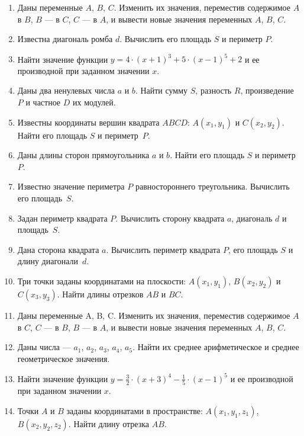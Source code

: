 \begin{enumerate}
\item Даны переменные $A$, $B$, $C$. Изменить их значения,
переместив содержимое $A$ в $B$, $B$ --- в $C$,
$C$ --- в $A$, и вывести новые значения переменных $A$,
$B$, $C$.

\item Известна диагональ ромба $d$. Вычислить его площадь $S$ и периметр
$P$.

\item Найти значение функции  $y=4\cdot (x+1)^{3}+5\cdot (x-1)^{5}+2$ и ее производной при заданном значении
$x$.

\item Даны два ненулевых числа $a$ и $b$. Найти сумму $S$,
разность $R$, произведение $P$ и частное $D$ их модулей.

\item Известны координаты вершин квадрата $ABCD$:
$A(x_1,y_1)$ и $C(x_2,y_2)$. Найти его площадь $S$ и периметр~$P$.

\item Даны длины сторон прямоугольника $a$ и $b$. Найти его площадь
$S$ и периметр~$P$.

\item Известно значение периметра $P$ равностороннего треугольника. Вычислить его площадь~$S$.

\item Задан периметр квадрата $P$. Вычислить сторону квадрата $a$, диагональ
$d$ и площадь~$S$.

\item Дана сторона квадрата $a$. Вычислить периметр квадрата $P$, его площадь
$S$ и длину диагонали~$d$.

\item Три точки заданы координатами на плоскости:
$A(x_1,y_1)$, $B(x_2,y_2)$ и $C(x_3,y_3)$. Найти длины
отрезков $AB$ и $BC$.

\item Даны переменные A, B, C. Изменить их значения, переместив содержимое $A$ в
$C$, $C$ --- в $B$, $B$ --- в
$A$, и вывести новые значения переменных $A$, $B$,
$C$.

\item Даны числа --- $a_1$, $a_2$, $a_3$, $a_4$, $a_5$.
Найти их среднее арифметическое и среднее геометрическое значения.

\item Найти значение функции  $y=\frac{3}{2}\cdot (x+3)^{4}-\frac{1}{5}\cdot (x-1)^{5}$  и ее производной при заданном
значении $x$.

\item Точки $A$ и $B$ заданы координатами в пространстве:
$A(x_1, y_1, z_1)$, $B(x_2, y_2, z_2)$. Найти длину отрезка $AB$.
\end{enumerate}

